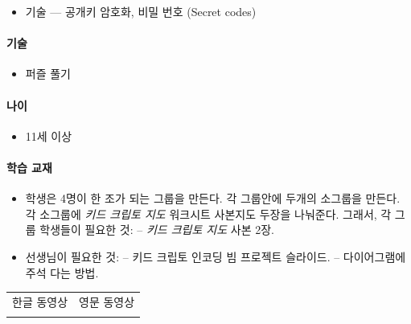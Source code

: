 \documentclass[]{article}
\begin{document}
\begin{itemize}
\itemsep1pt\parskip0pt
\item
  기술 --- 공개키 암호화, 비밀 번호 (Secret codes)
\end{itemize}

\mbox{}\paragraph{기술}\label{section-248}

\begin{itemize}
\itemsep1pt\parskip0pt
\item
  퍼즐 풀기
\end{itemize}

\mbox{}\paragraph{나이}\label{section-249}

\begin{itemize}
\itemsep1pt\parskip0pt
\item
  11세 이상
\end{itemize}

\mbox{}\paragraph{학습 교재}\label{section-250}

\begin{itemize}
\itemsep1pt\parskip0pt
\item
  학생은 4명이 한 조가 되는 그룹을 만든다. 각 그룹안에 두개의 소그룹을
  만든다. 각 소그룹에 \emph{키드 크립토 지도} 워크시트 사본지도 두장을
  나눠준다. 그래서, 각 그룹 학생들이 필요한 것: -- \emph{키드 크립토
  지도} 사본 2장.
\item
  선생님이 필요한 것: -- 키드 크립토 인코딩 빔 프로젝트 슬라이드. --
  다이어그램에 주석 다는 방법.
\end{itemize}


\begin{longtable}[c]{@{}ll@{}}
\toprule
\begin{minipage}[t]{0.47\columnwidth}\raggedright\strut
한글 동영상
\strut\end{minipage} &
\begin{minipage}[t]{0.47\columnwidth}\raggedright\strut
영문 동영상
\strut\end{minipage}\tabularnewline
\begin{minipage}[t]{0.47\columnwidth}\raggedright\strut
\strut\end{minipage} &
\begin{minipage}[t]{0.47\columnwidth}\raggedright\strut
\strut\end{minipage}\tabularnewline
\bottomrule
\end{longtable}
\end{document}
